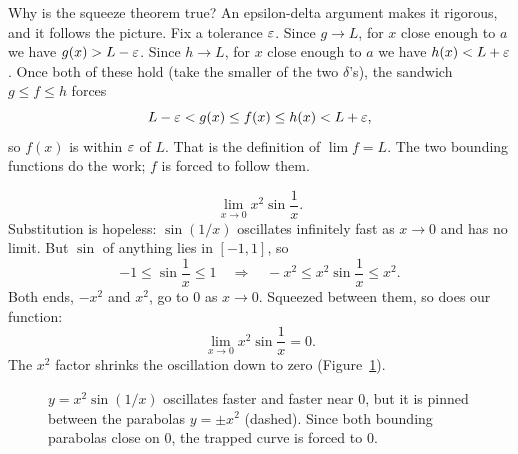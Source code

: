 \begin{whybox}
Why is the squeeze theorem true? An epsilon-delta argument makes it rigorous,
and it follows the picture. Fix a tolerance $\varepsilon$. Since $g\to L$, for $x$
close enough to $a$ we have
$g(x) > L-\varepsilon$. Since $h\to L$, for $x$ close enough to $a$ we have $h(x) < L+\varepsilon$. Once both of these
hold (take the smaller of the two $\delta$'s), the sandwich $g\le f\le h$ forces
\[
  L-\varepsilon < g(x) \le f(x) \le h(x) < L+\varepsilon,
\]
so $f(x)$ is within $\varepsilon$ of $L$. That is the definition of
$\lim f = L$. The two bounding functions do the work; $f$ is forced to follow them.
\end{whybox}

\begin{example}
\label{ch07:ex-squeeze-osc}
\[
  \lim_{x\to 0} x^{2}\sin\frac{1}{x}.
\]
Substitution is hopeless: $\sin(1/x)$ oscillates infinitely fast as $x\to 0$
and has no limit. But $\sin$ of anything lies in $[-1,1]$, so
\[
  -1 \le \sin\frac1x \le 1
  \quad\Longrightarrow\quad
  -x^{2} \le x^{2}\sin\frac1x \le x^{2}.
\]
Both ends, $-x^2$ and $x^2$, go to $0$ as $x\to 0$. Squeezed between them, so
does our function:
\[
  \lim_{x\to 0} x^{2}\sin\frac1x = 0.
\]
The $x^{2}$ factor shrinks the oscillation down to zero
(Figure~\ref{ch07:fig-squeeze}).
\end{example}

\begin{figure}[htbp]
\centering
{}
\caption{$y = x^{2}\sin(1/x)$ oscillates faster and faster near $0$, but it is
pinned between the parabolas $y=\pm x^{2}$ (dashed). Since both bounding parabolas close on
$0$, the trapped curve is forced to $0$.}
\label{ch07:fig-squeeze}
\end{figure}

